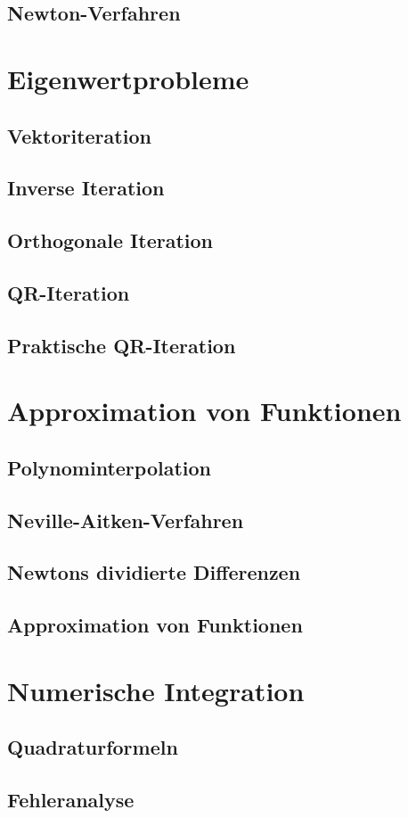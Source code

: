 \subsection{Newton-Verfahren}

\section{Eigenwertprobleme}
\subsection{Vektoriteration}
\subsection{Inverse Iteration}
\subsection{Orthogonale Iteration}
\subsection{QR-Iteration}
\subsection{Praktische QR-Iteration}

\section{Approximation von Funktionen}
\subsection{Polynominterpolation}
\subsection{Neville-Aitken-Verfahren}
\subsection{Newtons dividierte Differenzen}
\subsection{Approximation von Funktionen}

\section{Numerische Integration}
\subsection{Quadraturformeln}
\subsection{Fehleranalyse}